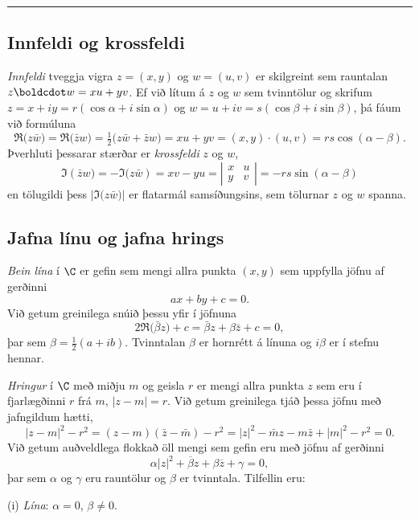 \bigskip\hrule\bigskip

\subsection*{Innfeldi og krossfeldi}

{\it Innfeldi} tveggja vigra
$z=(x,y)$ og $w=(u,v)$ er 
skilgreint sem rauntalan $z\boldcdot w=xu+yv$.
Ef við lítum á $z$ og $w$ sem tvinntölur og skrifum
$z=x+iy=r(\cos\alpha+i\sin \alpha)$ og
$w=u+iv=s(\cos\beta+i\sin\beta)$, þá fáum við formúluna
$$
\Re\big(z\bar w\big)=\Re\big(\bar z w\big)
=\tfrac 12\big(z\bar w+\bar z w\big)=xu+yv=(x,y)\cdot(u,v)=rs\cos(\alpha-\beta).
$$
Þverhluti þessarar stærðar er {\it krossfeldi} $z$ og $w$, 
$$
\Im(\bar z w\big)=-\Im\big(z\bar w)=xv-yu=\left|\begin{matrix}
 x&u  \\
 y&v 
\end{matrix}\right|=-rs\sin(\alpha-\beta)
$$
en tölugildi
 þess $|\Im\big(z\bar w)|$ er flatarmál
samsíðungsins, sem tölurnar $z$ og $w$ spanna.  


\subsection*{Jafna línu og jafna hrings}

{\it Bein lína} í $\C$ er gefin sem mengi allra punkta $(x,y)$
sem uppfylla jöfnu af gerðinni
$$
ax+by+c=0.
$$
Við getum greinilega snúið þessu yfir í jöfnuna 
$$
2\Re\big( \bar {\beta} z\big)+c=\bar {\beta} z+{\beta}\bar z+c=0,
$$
þar sem ${\beta}=\frac 12(a+ib)$.  Tvinntalan ${\beta}$ er hornrétt á
línuna og $i{\beta}$ er í stefnu hennar. 


{\it Hringur } í $\C$ með miðju $m$ og geisla $r$ er mengi allra
punkta $z$ sem eru í fjarlægðinni $r$ frá $m$,
$|z-m|=r$. Við getum greinilega tjáð þessa jöfnu með jafngildum hætti,
 $$|z-m|^2-r^2=(z-m)(\bar z-\bar m)-r^2=|z|^2-\bar
mz-m\bar z +|m|^2-r^2=0.
 $$
Við getum auðveldlega flokkað öll mengi sem gefin eru með jöfnu af
gerðinni
 \begin{equation}\alpha|z|^2+\overline \beta z+\beta\overline z +\gamma=0,
 \end{equation}
þar sem $\alpha$ og $\gamma$ eru rauntölur og $\beta$ er tvinntala.
Tilfellin eru:

\noindent
(i) {\it Lína}:  $\alpha=0$, $\beta\neq 0$.

